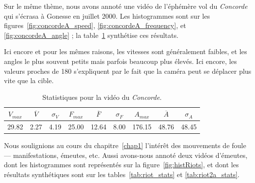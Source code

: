 	Sur le même thème, nous avons annoté une vidéo de l'éphémère vol du \emph{Concorde} qui s'écrasa à Gonesse en juillet 2000\footnotemark{}. Les histogrammes sont sur les figures~\ref{fig:concordeA_speed}, \ref{fig:concordeA_frequency}, et \ref{fig:concordeA_angle} ; la table~\ref{tab:concordeA_stats} synthétise ces résultats.
	
	Ici encore et pour les mêmes raisons, les vitesses sont généralement faibles, et les angles le plus souvent petits mais parfois beaucoup plus élevés. Ici encore, les valeurs proches de 180\textdegree{} s'expliquent par le fait que la caméra peut se déplacer plus vite que la cible.	
	

\begin{table}
	\centering
	\begin{tabular}{c c c c c c c c c}
		$V_{max}$	& $\overline{V}$	& $\sigma_{V}$	& $F_{max}$	& $\overline{F}$	& $\sigma_{F}$	& $A_{max}$	& $\overline{A}$	& $\sigma_{A}$	\bigstrut[b] \\ \hline

		29.82		& 2.27				& 4.19			& 25.00		& 12.64				& 8.00			& 176.15	& 48.76				& 48.45			\bigstrut[t] \\
	\end{tabular}
	\caption[Statistiques pour la vidéo du \emph{Concorde}]{Statistiques pour la vidéo du \emph{Concorde}.}
	\label{tab:concordeA_stats}
\end{table}

	Nous soulignions au cours du chapitre~\ref{chap1} l'intérêt des mouvements de foule --- manifestations, émeutes, etc. Aussi avons-nous annoté deux vidéos d'émeutes, dont les histogrammes sont représentés sur la figure~\ref{fig:histRiots}, et dont les résultats synthétiques sont sur les tables~\ref{tab:riot_stats} et \ref{tab:riot2a_stats}.

